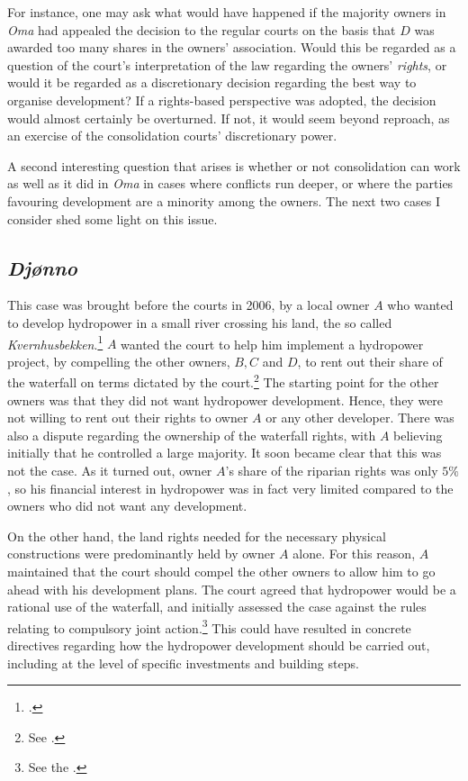 For instance, one may ask what would have happened if the majority owners in \emph{Oma} had appealed the decision to the regular courts on the basis that $D$ was awarded too many shares in the owners' association. Would this be regarded as a question of the court's interpretation of the law regarding the owners' \emph{rights}, or would it be regarded as a discretionary decision regarding the best way to organise development? If a rights-based perspective was adopted, the decision would almost certainly be overturned. If not, it would seem beyond reproach, as an exercise of the consolidation courts' discretionary power.

A second interesting question that arises is whether or not consolidation can work as well as it did in \emph{Oma} in cases where conflicts run deeper, or where the parties favouring development are a minority among the owners. The next two cases I consider shed some light on this issue.

\subsection{\emph{Djønno}}\label{sec:6:4:3}

This case was brought before the courts in 2006, by a local owner $A$ who wanted to develop hydropower in a small river crossing his land, the so called \emph{Kvernhusbekken}.\footcite{djonno06} $A$ wanted the court to help him implement a hydropower project, by compelling the other owners, $B, C$ and $D$, to rent out their share of the waterfall on terms dictated by the court.\footnote{See \cite[28-31]{stokstad11}.} The starting point for the other owners was that they did not want hydropower development. Hence, they were not willing to rent out their rights to owner $A$ or any other developer. There was also a dispute regarding the ownership of the waterfall rights, with $A$ believing initially that he controlled a large majority. It soon became clear that this was not the case. As it turned out, owner $A$'s share of the riparian rights was only $5 \%$, so his financial interest in hydropower was in fact very limited compared to the owners who did not want any development.

On the other hand, the land rights needed for the necessary physical constructions were predominantly held by owner $A$ alone. For this reason, $A$ maintained that the court should compel the other owners to allow him to go ahead with his development plans. The court agreed that hydropower would be a rational use of the waterfall, and initially assessed the case against the rules relating to compulsory joint action.\footnote{See the \dni\cite[2 e)]{lca79}.} This could have resulted in concrete directives regarding how the hydropower development should be carried out, including at the level of specific investments and building steps.

